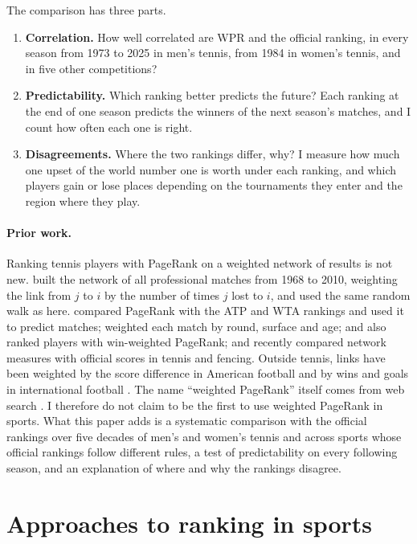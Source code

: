 \documentclass[11pt]{article}
\begin{document}
The comparison has three parts.
\begin{enumerate}
  \item \textbf{Correlation.} How well correlated are WPR and the official ranking, in every season from 1973 to 2025 in men's tennis, from 1984 in women's tennis, and in five other competitions?
  \item \textbf{Predictability.} Which ranking better predicts the future? Each ranking at the end of one season predicts the winners of the next season's matches, and I count how often each one is right.
  \item \textbf{Disagreements.} Where the two rankings differ, why? I measure how much one upset of the world number one is worth under each ranking, and which players gain or lose places depending on the tournaments they enter and the region where they play.
\end{enumerate}

\paragraph{Prior work.} Ranking tennis players with PageRank on a weighted network of results is not new. \citet{radicchi2011} built the network of all professional matches from 1968 to 2010, weighting the link from $j$ to $i$ by the number of times $j$ lost to $i$, and used the same random walk as here. \citet{dingle2013} compared PageRank with the ATP and WTA rankings and used it to predict matches; \citet{aronson2017} weighted each match by round, surface and age; \citet{michieli2018} and \citet{needham2018} also ranked players with win-weighted PageRank; and \citet{asztalos2026} recently compared network measures with official scores in tennis and fencing. Outside tennis, links have been weighted by the score difference in American football \citep{govan2008} and by wins and goals in international football \citep{lazova2015}. The name ``weighted PageRank'' itself comes from web search \citep{xing2004}. I therefore do not claim to be the first to use weighted PageRank in sports. What this paper adds is a systematic comparison with the official rankings over five decades of men's and women's tennis and across sports whose official rankings follow different rules, a test of predictability on every following season, and an explanation of where and why the rankings disagree.

\section{Approaches to ranking in sports}
\end{document}

